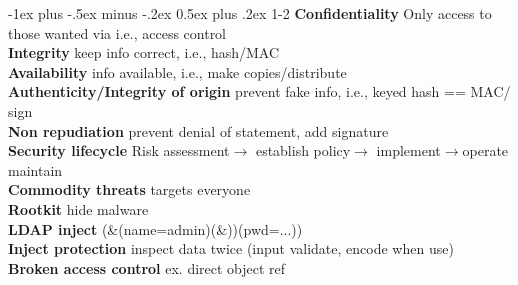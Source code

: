 \documentclass[10pt,landscape]{article}
\makeatletter
\renewcommand{\section}{\@startsection{section}{1}{0mm}%
                                {-1ex plus -.5ex minus -.2ex}%
                                {0.5ex plus .2ex}%
                                {\normalfont\large\bfseries}}
\makeatother
\begin{document}
\raggedright
\footnotesize
\begin{multicols*}{4}


\setlength{\premulticols}{1pt}
\setlength{\postmulticols}{1pt}
\setlength{\multicolsep}{1pt}
\setlength{\columnsep}{2pt}

\section{1-2}
\textbf{Confidentiality} Only access to those wanted via i.e., access control\\
\textbf{Integrity} keep info correct, i.e., hash/MAC\\
\textbf{Availability} info available, i.e., make copies/distribute\\
\textbf{Authenticity/Integrity of origin} prevent fake info, i.e., keyed hash == MAC/ sign\\
\textbf{Non repudiation} prevent denial of statement, add signature\\
\textbf{Security lifecycle} Risk assessment$\rightarrow$ establish policy$\rightarrow$ implement$\rightarrow$operate maintain\\
\textbf{Commodity threats} targets everyone\\
\textbf{Rootkit} hide malware\\
\textbf{LDAP inject} (\&(name=admin)(\&))(pwd=...))\\
\textbf{Inject protection} inspect data twice (input validate, encode when use)\\
\textbf{Broken access control} ex. direct object ref\\


\end{multicols*}
\end{document}
